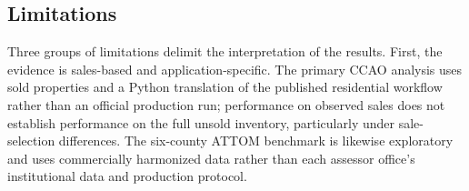 \documentclass[10pt]{article}
\theoremstyle{definition}
\newcommand{\1}{\mathbf{1}}
\newcommand{\oldtext}[1]{\textcolor{blue}{\sout{#1}}}
\newcommand{\newtext}[1]{\textcolor{impGreen}{#1}}
\begin{document}
\subsection{Limitations}


\newtext{Three groups of limitations delimit the interpretation of the results. First, the evidence is sales-based and application-specific. The primary CCAO analysis uses sold properties and a Python translation of the published residential workflow rather than an official production run; performance on observed sales does not establish performance on the full unsold inventory, particularly under sale-selection differences. The six-county ATTOM benchmark is likewise exploratory and uses commercially harmonized data rather than each assessor office's institutional data and production protocol.}
\end{document}
